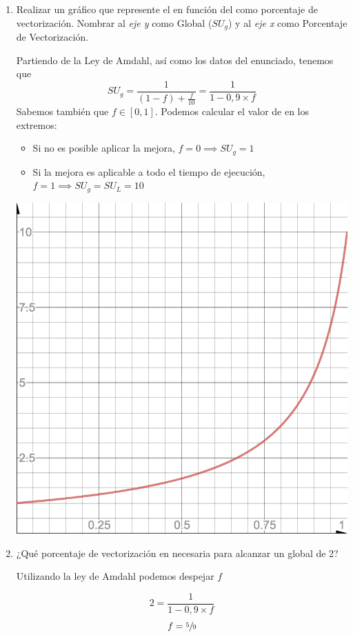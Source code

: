 \begin{enumerate}
 \item Realizar un gráfico que represente el \SU en función del como porcentaje de vectorización. Nombrar al \textit{eje y} como \SU Global ($SU_g$) y al \textit{eje x} como Porcentaje de Vectorización.

 Partiendo de la Ley de Amdahl, así como los datos del enunciado, tenemos que $$ SU_g = \frac{1}{(1-f) + \frac{f}{10}} = \frac{1}{1 - 0,9 \times f}$$
 Sabemos también que $ f \in [0, 1] $. Podemos calcular el valor de \SU en los extremos:
 \begin{itemize}
 \item Si no es posible aplicar la mejora, $f = 0 \implies SU_g = 1$
 \item Si la mejora es aplicable a todo el tiempo de ejecución, $ f = 1 \implies SU_g = SU_L = 10 $
 \end{itemize}

 \includegraphics[scale=0.5]{gfx/amdahl_resuelto_1.png}
 
 \item ¿Qué porcentaje de vectorización en necesaria para alcanzar un \SU global de 2?

 Utilizando la ley de Amdahl podemos despejar $f$

 $$ 2 = \frac{1}{1 - 0,9 \times f}$$
 $$ f  = \sfrac{5}{9} $$
 

\end{enumerate}

